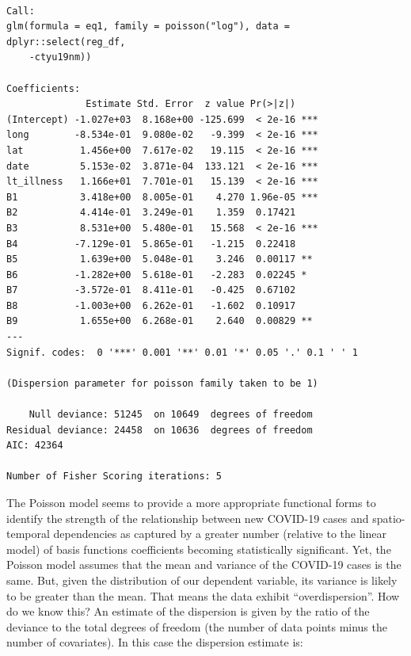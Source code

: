 \documentclass[
  letterpaper,
  DIV=11,
  numbers=noendperiod,
  oneside]{scrreprt}
\newenvironment{Shaded}{\begin{snugshade}}{\end{snugshade}}
\newcommand{\NormalTok}[1]{\textcolor[rgb]{0.00,0.23,0.31}{#1}}
\newcommand{\SpecialCharTok}[1]{\textcolor[rgb]{0.37,0.37,0.37}{#1}}
\begin{document}
\begin{verbatim}

Call:
glm(formula = eq1, family = poisson("log"), data = dplyr::select(reg_df, 
    -ctyu19nm))

Coefficients:
              Estimate Std. Error  z value Pr(>|z|)    
(Intercept) -1.027e+03  8.168e+00 -125.699  < 2e-16 ***
long        -8.534e-01  9.080e-02   -9.399  < 2e-16 ***
lat          1.456e+00  7.617e-02   19.115  < 2e-16 ***
date         5.153e-02  3.871e-04  133.121  < 2e-16 ***
lt_illness   1.166e+01  7.701e-01   15.139  < 2e-16 ***
B1           3.418e+00  8.005e-01    4.270 1.96e-05 ***
B2           4.414e-01  3.249e-01    1.359  0.17421    
B3           8.531e+00  5.480e-01   15.568  < 2e-16 ***
B4          -7.129e-01  5.865e-01   -1.215  0.22418    
B5           1.639e+00  5.048e-01    3.246  0.00117 ** 
B6          -1.282e+00  5.618e-01   -2.283  0.02245 *  
B7          -3.572e-01  8.411e-01   -0.425  0.67102    
B8          -1.003e+00  6.262e-01   -1.602  0.10917    
B9           1.655e+00  6.268e-01    2.640  0.00829 ** 
---
Signif. codes:  0 '***' 0.001 '**' 0.01 '*' 0.05 '.' 0.1 ' ' 1

(Dispersion parameter for poisson family taken to be 1)

    Null deviance: 51245  on 10649  degrees of freedom
Residual deviance: 24458  on 10636  degrees of freedom
AIC: 42364

Number of Fisher Scoring iterations: 5
\end{verbatim}

The Poisson model seems to provide a more appropriate functional forms
to identify the strength of the relationship between new COVID-19 cases
and spatio-temporal dependencies as captured by a greater number
(relative to the linear model) of basis functions coefficients becoming
statistically significant. Yet, the Poisson model assumes that the mean
and variance of the COVID-19 cases is the same. But, given the
distribution of our dependent variable, its variance is likely to be
greater than the mean. That means the data exhibit ``overdispersion''.
How do we know this? An estimate of the dispersion is given by the ratio
of the deviance to the total degrees of freedom (the number of data
points minus the number of covariates). In this case the dispersion
estimate is:

\begin{Shaded}
\end{Shaded}
\end{document}
